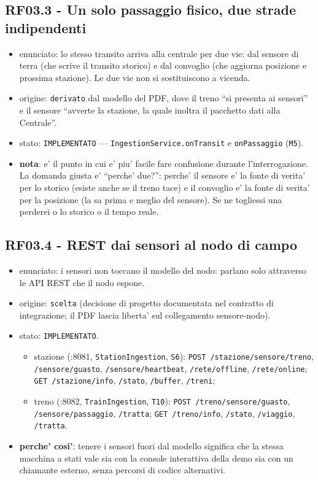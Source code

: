 \documentclass[11pt]{article}
\begin{document}
\subsection{RF03.3 - Un solo passaggio fisico, due strade indipendenti}
\label{sec:org7cc4225}
\begin{itemize}
\item enunciato: lo stesso transito arriva alla centrale per due vie: dal sensore di terra (che scrive
il transito storico) e dal convoglio (che aggiorna posizione e prossima stazione). Le due vie non
si sostituiscono a vicenda.
\item origine: \texttt{derivato} dal modello del PDF, dove il treno ``si presenta ai sensori'' e il sensore
``avverte la stazione, la quale inoltra il pacchetto dati alla Centrale''.
\item stato: \texttt{IMPLEMENTATO} — \texttt{IngestionService.onTransit} e \texttt{onPassaggio} (\texttt{M5}).
\item \textbf{nota}: e' il punto in cui e' piu' facile fare confusione durante l'interrogazione. La domanda
giusta e' ``perche' due?'': perche' il sensore e' la fonte di verita' per lo storico (esiste anche
se il treno tace) e il convoglio e' la fonte di verita' per la posizione (la sa prima e meglio del
sensore). Se ne togliessi una perderei o lo storico o il tempo reale.
\end{itemize}
\subsection{RF03.4 - REST dai sensori al nodo di campo}
\label{sec:org12c8026}
\begin{itemize}
\item enunciato: i sensori non toccano il modello del nodo: parlano solo attraverso le API REST che il
nodo espone.
\item origine: \texttt{scelta} (decisione di progetto documentata nel contratto di integrazione; il PDF lascia
liberta' sul collegamento sensore-nodo).
\item stato: \texttt{IMPLEMENTATO}.
\begin{itemize}
\item stazione (:8081, \texttt{StationIngestion}, \texttt{S6}): \texttt{POST /stazione/sensore/treno},
\texttt{/sensore/guasto}, \texttt{/sensore/heartbeat}, \texttt{/rete/offline}, \texttt{/rete/online};
\texttt{GET /stazione/info}, \texttt{/stato}, \texttt{/buffer}, \texttt{/treni};
\item treno (:8082, \texttt{TrainIngestion}, \texttt{T10}): \texttt{POST /treno/sensore/guasto}, \texttt{/sensore/passaggio},
\texttt{/tratta}; \texttt{GET /treno/info}, \texttt{/stato}, \texttt{/viaggio}, \texttt{/tratta}.
\end{itemize}
\item \textbf{perche' cosi'}: tenere i sensori fuori dal modello significa che la stessa macchina a stati vale
sia con la console interattiva della demo sia con un chiamante esterno, senza percorsi di codice
alternativi.
\end{itemize}
\end{document}
